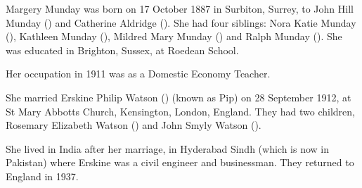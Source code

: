 
Margery Munday was born on 17 October 1887 in	Surbiton, Surrey, to John Hill Munday () and Catherine Aldridge (). She had four siblings: Nora Katie Munday (), Kathleen Munday (), Mildred Mary Munday () and Ralph Munday ().
She was educated in Brighton, Sussex, at Roedean School.

Her occupation in 1911 was as a Domestic Economy Teacher. \cite{MMundayOccupation}

She married Erskine Philip Watson () (known as Pip) on 28 September 1912, at St Mary Abbotts Church, Kensington, London, England.  They had two children, Rosemary Elizabeth Watson () and John Smyly Watson ().

She lived in India after her marriage, in Hyderabad Sindh (which is now in Pakistan)  where Erskine was a civil engineer and businessman.  They returned to England in 1937.
